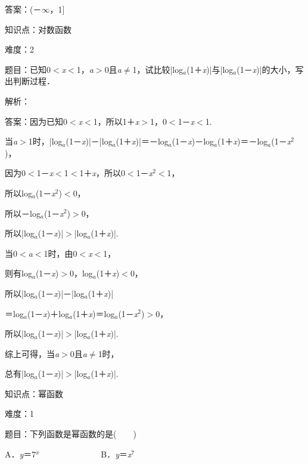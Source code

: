 \documentclass{article} %
\begin{document}
答案：(－$\mathrm{\infty}$，1]

知识点：对数函数

难度：2

题目：已知0$\mathrm{<}$\textit{x}$\mathrm{<}$1，\textit{a}$\mathrm{>}$0且\textit{a}$\mathrm{\neq}$1，试比较|log\textit{${}_{a}$}(1＋\textit{x})|与|log\textit{${}_{a}$}(1－\textit{x})|的大小，写出判断过程．

解析：

答案：因为已知0$\mathrm{<}$\textit{x}$\mathrm{<}$1，所以1＋\textit{x}$\mathrm{>}$1，0$\mathrm{<}$1－\textit{x}$\mathrm{<}$1.

当\textit{a}$\mathrm{>}$1时，|log\textit{${}_{a}$}(1－\textit{x})|－|log\textit{${}_{a}$}(1＋\textit{x})|＝－log\textit{${}_{a}$}(1－\textit{x})－log\textit{${}_{a}$}(1＋\textit{x})＝－log\textit{${}_{a}$}(1－\textit{x}${}^{2}$)，

因为0$\mathrm{<}$1－\textit{x}$\mathrm{<}$1$\mathrm{<}$1＋\textit{x}，所以0$\mathrm{<}$1－\textit{x}${}^{2}$$\mathrm{<}$1，

所以log\textit{${}_{a}$}(1－\textit{x}${}^{2}$)$\mathrm{<}$0，

所以－log\textit{${}_{a}$}(1－\textit{x}${}^{2}$)$\mathrm{>}$0，

所以|log\textit{${}_{a}$}(1－\textit{x})|$\mathrm{>}$|log\textit{${}_{a}$}(1＋\textit{x})|.

当0$\mathrm{<}$\textit{a}$\mathrm{<}$1时，由0$\mathrm{<}$\textit{x}$\mathrm{<}$1，

则有log\textit{${}_{a}$}(1－\textit{x})$\mathrm{>}$0，log\textit{${}_{a}$}(1＋\textit{x})$\mathrm{<}$0，

所以|log\textit{${}_{a}$}(1－\textit{x})|－|log\textit{${}_{a}$}(1＋\textit{x})|

＝log\textit{${}_{a}$}(1－\textit{x})＋log\textit{${}_{a}$}(1＋\textit{x})＝log\textit{${}_{a}$}(1－\textit{x}${}^{2}$)$\mathrm{>}$0，

所以|log\textit{${}_{a}$}(1－\textit{x})|$\mathrm{>}$|log\textit{${}_{a}$}(1＋\textit{x})|.

综上可得，当\textit{a}$\mathrm{>}$0且\textit{a}$\mathrm{\neq}$1时，

总有|log\textit{${}_{a}$}(1－\textit{x})|$\mathrm{>}$|log\textit{${}_{a}$}(1＋\textit{x})|.

知识点：幂函数

难度：1

题目：下列函数是幂函数的是(　　)

A．\textit{y}＝7\textit{${}^{x}$}　　　　　　　 B．\textit{y}＝\textit{x}${}^{7}$
\end{document}
